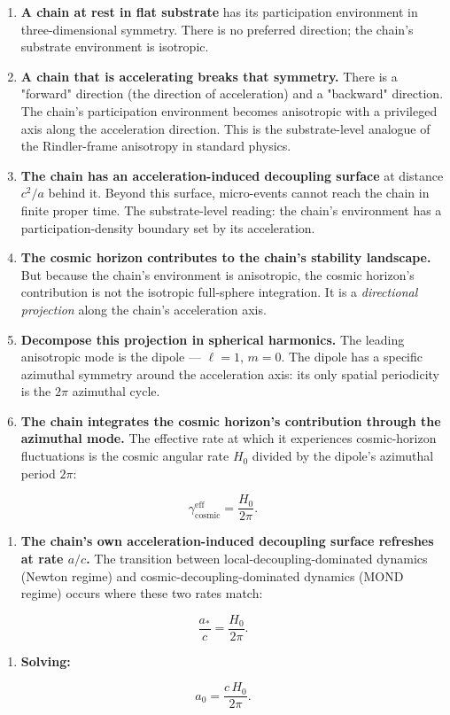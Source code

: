 \documentclass[11pt]{book}
\begin{document}
\begin{enumerate}
\item \textbf{A chain at rest in flat substrate} has its participation environment in three-dimensional symmetry. There is no preferred direction; the chain's substrate environment is isotropic.
\item \textbf{A chain that is accelerating breaks that symmetry.} There is a "forward" direction (the direction of acceleration) and a "backward" direction. The chain's participation environment becomes anisotropic with a privileged axis along the acceleration direction. This is the substrate-level analogue of the Rindler-frame anisotropy in standard physics.
\item \textbf{The chain has an acceleration-induced decoupling surface} at distance $c^2/a$ behind it. Beyond this surface, micro-events cannot reach the chain in finite proper time. The substrate-level reading: the chain's environment has a participation-density boundary set by its acceleration.
\item \textbf{The cosmic horizon contributes to the chain's stability landscape.} But because the chain's environment is anisotropic, the cosmic horizon's contribution is not the isotropic full-sphere integration. It is a \textit{directional projection} along the chain's acceleration axis.
\item \textbf{Decompose this projection in spherical harmonics.} The leading anisotropic mode is the dipole — $\ell = 1$, $m = 0$. The dipole has a specific azimuthal symmetry around the acceleration axis: its only spatial periodicity is the $2\pi$ azimuthal cycle.
\item \textbf{The chain integrates the cosmic horizon's contribution through the azimuthal mode.} The effective rate at which it experiences cosmic-horizon fluctuations is the cosmic angular rate $H_0$ divided by the dipole's azimuthal period $2\pi$:
\end{enumerate}
\[
\gamma_\mathrm{cosmic}^\mathrm{eff} = \frac{H_0}{2\pi}.
\]
\begin{enumerate}
\item \textbf{The chain's own acceleration-induced decoupling surface refreshes at rate $a/c$.} The transition between local-decoupling-dominated dynamics (Newton regime) and cosmic-decoupling-dominated dynamics (MOND regime) occurs where these two rates match:
\end{enumerate}
\[
\frac{a_*}{c} = \frac{H_0}{2\pi}.
\]
\begin{enumerate}
\item \textbf{Solving:}
\end{enumerate}
\[
a_0 = \frac{c\,H_0}{2\pi}.
\]
\end{document}

